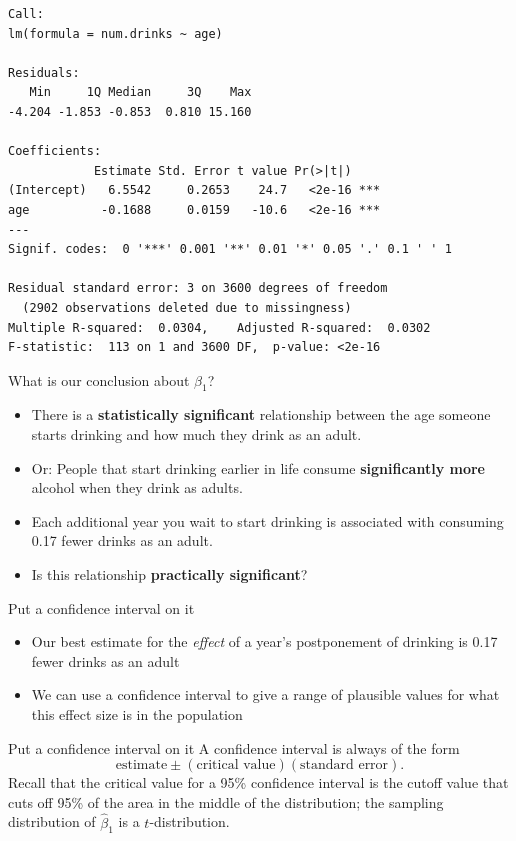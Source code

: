 \documentclass{beamer}\usepackage[]{graphicx}\usepackage[]{color}
\makeatletter
\newenvironment{kframe}{%
 \def\at@end@of@kframe{}%
 \ifinner\ifhmode%
  \def\at@end@of@kframe{\end{minipage}}%
  \begin{minipage}{\columnwidth}%
 \fi\fi%
 \def\FrameCommand##1{\hskip\@totalleftmargin \hskip-\fboxsep
 \colorbox{shadecolor}{##1}\hskip-\fboxsep
     \hskip-\linewidth \hskip-\@totalleftmargin \hskip\columnwidth}%
 \MakeFramed {\advance\hsize-\width
   \@totalleftmargin\z@ \linewidth\hsize
   \@setminipage}}%
 {\par\unskip\endMakeFramed%
 \at@end@of@kframe}
\newenvironment{knitrout}{}{} %
\makeatother
\begin{document}
\begin{darkframes}
\begin{frame}[fragile]
\begin{knitrout}
\begin{kframe}
\begin{verbatim}
Call:
lm(formula = num.drinks ~ age)

Residuals:
   Min     1Q Median     3Q    Max 
-4.204 -1.853 -0.853  0.810 15.160 

Coefficients:
            Estimate Std. Error t value Pr(>|t|)    
(Intercept)   6.5542     0.2653    24.7   <2e-16 ***
age          -0.1688     0.0159   -10.6   <2e-16 ***
---
Signif. codes:  0 '***' 0.001 '**' 0.01 '*' 0.05 '.' 0.1 ' ' 1

Residual standard error: 3 on 3600 degrees of freedom
  (2902 observations deleted due to missingness)
Multiple R-squared:  0.0304,	Adjusted R-squared:  0.0302 
F-statistic:  113 on 1 and 3600 DF,  p-value: <2e-16
\end{verbatim}
\end{kframe}
\end{knitrout}
    \end{frame}

    \begin{frame}{What is our conclusion about $\beta_1$?}
      \begin{itemize}[<+->]
        \item There is a \textbf{statistically significant} relationship between the age someone starts drinking and how much they drink as an adult.
        \item Or: People that start drinking earlier in life consume \textbf{significantly more} alcohol when they drink as adults.
        \item Each additional year you wait to start drinking is associated with consuming 0.17 fewer drinks as an adult.
        \item Is this relationship \textbf{practically significant}?
      \end{itemize}
    \end{frame}

    \begin{frame}{Put a confidence interval on it}
      \begin{itemize}[<+->]
        \item Our best estimate for the \emph{effect} of a year's postponement of drinking is 0.17 fewer drinks as an adult
        \item We can use a confidence interval to give a range of plausible values for what this effect size is in the population 
      \end{itemize}
    \end{frame}

    \begin{frame}[fragile]{Put a confidence interval on it}
      A confidence interval is always of the form \[ \text{estimate} \pm (\text{critical value})(\text{standard error}). \]
      \pause
      Recall that the critical value for a 95\% confidence interval is the cutoff value that cuts off 95\% of the area in the middle of the distribution; the sampling distribution of $\hat\beta_1$ is a $t$-distribution.



\end{frame}
\end{darkframes}
\end{document}
